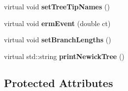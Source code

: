 \begin{DoxyCompactItemize}
virtual void {\bfseries set\+Tree\+Tip\+Names} ()
\item 
\mbox{\label{class_tree_aa678f8726c2b4ed00490e815e7620a1b}} 
virtual void {\bfseries erm\+Event} (double ct)
\item 
\mbox{\label{class_tree_a4fe4b0140f623adf84f72a8ae5c1ac87}} 
virtual void {\bfseries set\+Branch\+Lengths} ()
\item 
\mbox{\label{class_tree_a6fc5ae8938331ced5295a29593cbedd6}} 
virtual std\+::string {\bfseries print\+Newick\+Tree} ()
\end{DoxyCompactItemize}
\subsection*{Protected Attributes}
